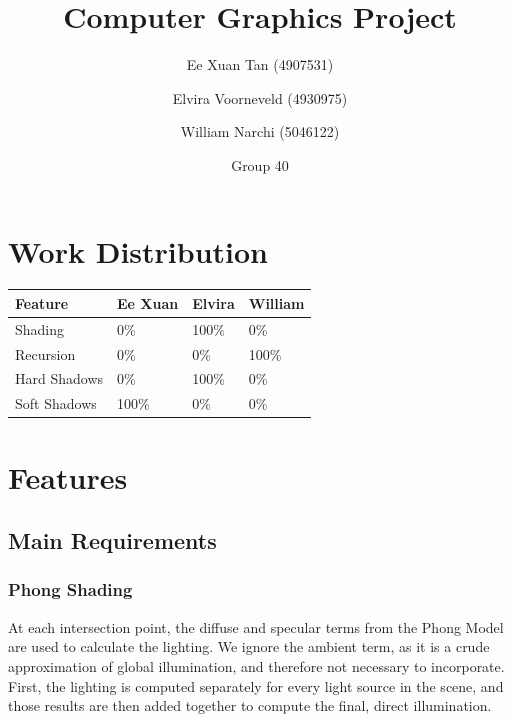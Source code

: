 \documentclass{article}
\author{Ee Xuan Tan (4907531) \and Elvira Voorneveld (4930975) \and William Narchi (5046122)}
\date{Group 40} %
\title{Computer Graphics Project}
\begin{document}
    \maketitle

    \section{Work Distribution}
    
    \begin{tabular}{ |p{2.5cm}||p{2.5cm}|p{2.5cm}|p{2.5cm}| }
        \hline
        \textbf{Feature} &\textbf{Ee Xuan} &\textbf{Elvira} &\textbf{William}\\
        \hline
        Shading         &0\%    &100\%  &0\%\\
        Recursion       &0\%    &0\%    &100\%\\
        Hard Shadows    &0\%    &100\%  &0\%\\
        Soft Shadows    &100\%  &0\%    &0\%\\
        \hline
    \end{tabular}

    \section{Features}
    \subsection{Main Requirements}
    \subsubsection{Phong Shading}
    At each intersection point, the diffuse and specular terms from the Phong Model are used to calculate the lighting.
    We ignore the ambient term, as it is a crude approximation of global illumination, and therefore not necessary to incorporate.
    First, the lighting is computed separately for every light source in the scene, 
    and those results are then added together to compute the final, direct illumination.
\end{document}
